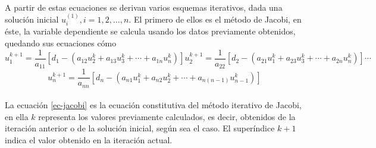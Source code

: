 \documentclass[letterpaper, openright, 12pt]{book}
\begin{document}
			\paragraph*{}
				A partir de estas ecuaciones se derivan varios esquemas iterativos, dada una solución inicial $u_{i}^{(1)}, i = 1, 2, \dotsc, n$. El primero de ellos es el método de Jacobi, en éste, la variable dependiente se calcula usando los datos previamente obtenidos, quedando sus ecuaciones cómo
				\begin{subequations}
					\begin{equation*}
						u_{1}^{k+1} = \frac{1}{a_{11}} \left[ d_{1} - \left( a_{12}u_{2}^{k} + a_{13}u_{3}^{k} + \dotsb + a_{1n}u_{n}^k \right) \right]
					\end{equation*}
					\begin{equation*}
					u_{2}^{k+1} = \frac{1}{a_{22}} \left[ d_{2} - \left( a_{21}u_{1}^{k} + a_{23}u_{3}^{k} + \dotsb + a_{2n}u_{n}^{k} \right) \right]
					\end{equation*}
					\begin{equation*}
					\dotsb
					\end{equation*}
				\end{subequations}
				\begin{equation}
					u_{n}^{k+1} = \frac{1}{a_{nn}} \left[ d_{n} - \left( a_{n1}u_{1}^{k} + a_{n2}u_{2}^{k} + \dotsb + a_{n\left( n-1 \right)}u_{n-1}^{k} \right) \right]
					\label{ec-jacobi}
				\end{equation}
				
			\paragraph*{}
				La ecuación \ref{ec-jacobi} es la ecuación constitutiva del método iterativo de Jacobi, en ella $k$ representa los valores previamente calculados, es decir, obtenidos de la iteración anterior o de la solución inicial, según sea el caso. El superíndice $k+1$ indica el valor obtenido en la iteración actual.
			
\end{document}
